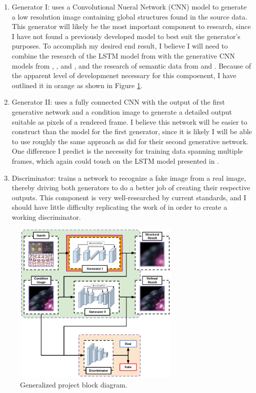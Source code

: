 \documentclass[conference]{IEEEtran}
\begin{document}
\begin{enumerate}
\item Generator I: uses a Convolutional Nueral Network (CNN) model to generate a
low resolution image containing global structures found in the
source data. This generator will likely be the most important component to
research, since I have not found a previously developed model to best suit the
generator's purposes. To accomplish my desired end result,
I believe I will need to combine the research of the LSTM
model from \cite{ref:frame_prediction} with the
generative CNN models from \cite{ref:pixelcnn_decoders}, \cite{ref:pixelcnn++},
and \cite{ref:multi_source}, and the research of semantic data from
\cite{ref:image_captioning} and \cite{ref:posecnn}. Because of the apparent
level of developmenet necessary for this compoenent, I have
outlined it in orange as shown in Figure \ref{fig:block_diagram}.
\item Generator II: uses a fully connected CNN with the output of the first generative network and a
condition image to generate a detailed output suitable as pixels of a rendered
frame. I believe this network will be easier to construct than the model for the
first generator, since it is likely I will be able to use roughly the same approach as
\cite{ref:pose_guided} did for their second generative network. One difference I
predict is the necessity for training data spanning multiple frames, which again
could touch on the LSTM model presented in \cite{ref:frame_prediction}.
\item Discriminator: trains a network to recognize a fake image from a real
image, thereby driving both generators to do a better job of creating their
respective outputs. This component is very well-researched by current standards,
and I should have little difficulty replicating the work of
\cite{ref:pose_guided} in order to create a working discriminator.
\end{enumerate}

\begin{figure}[htbp]
\centerline{\includegraphics[width=8cm]{block_diagram.png}}
\caption{Generalized project block diagram.}
\label{fig:block_diagram}
\end{figure}
\end{document}
